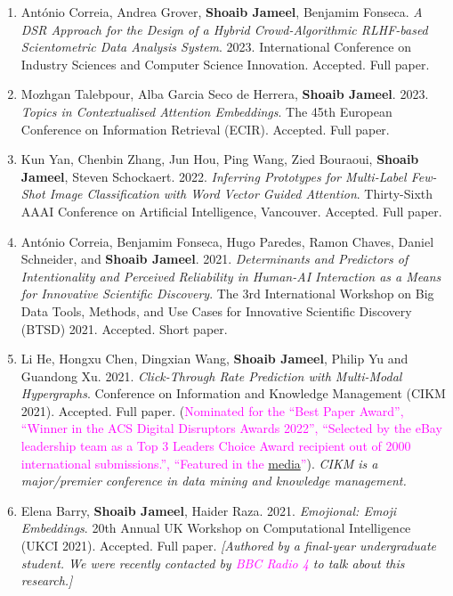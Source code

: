 \documentclass[margin]{res}
\begin{document}
\begin{resume}
\begin{enumerate}
\item Ant\'onio Correia, Andrea Grover, \textbf{Shoaib Jameel}, Benjamim Fonseca. \textit{A DSR Approach for the Design of a Hybrid Crowd-Algorithmic RLHF-based Scientometric Data Analysis System}. 2023. International Conference on Industry Sciences and Computer Science Innovation. Accepted. Full paper. \newline

\item Mozhgan Talebpour, Alba Garcia Seco de Herrera, \textbf{Shoaib Jameel}. 2023. \textit{Topics in Contextualised Attention Embeddings}. The 45th European Conference on Information Retrieval (ECIR). Accepted. Full paper. \newline

\item Kun Yan, Chenbin Zhang, Jun Hou, Ping Wang, Zied Bouraoui, \textbf{Shoaib Jameel}, Steven Schockaert. 2022. \textit{Inferring Prototypes for Multi-Label Few-Shot Image Classification with Word Vector Guided Attention}. Thirty-Sixth AAAI Conference on Artificial Intelligence, Vancouver. Accepted. Full paper. \newline

\item António Correia, Benjamim Fonseca, Hugo Paredes, Ramon Chaves, Daniel Schneider, and \textbf{Shoaib Jameel}. 2021. \textit{Determinants and Predictors of Intentionality and Perceived Reliability in Human-AI Interaction as a Means for Innovative Scientific Discovery}. The 3rd International Workshop on Big Data Tools, Methods, and Use Cases for Innovative Scientific Discovery (BTSD) 2021. Accepted. Short paper. \newline

\item Li He, Hongxu Chen, Dingxian Wang, \textbf{Shoaib Jameel}, Philip Yu and Guandong Xu. 2021. \textit{Click-Through Rate Prediction with Multi-Modal Hypergraphs}. Conference on Information and Knowledge Management (CIKM 2021). Accepted. Full paper. (\textcolor{magenta}{Nominated for the ``Best Paper Award'', ``Winner in the ACS Digital Disruptors Awards 2022'', ``Selected by the eBay leadership team as a Top 3 Leaders Choice Award recipient out of 2000 international submissions.'', ``Featured in the \href{https://www.bandt.com.au/reaching-gen-z-a-new-tool-for-marketers/}{media}''}). \textit{CIKM is a major/premier conference in data mining and knowledge management.} \newline

\item Elena Barry, \textbf{Shoaib Jameel}, Haider Raza. 2021. \textit{Emojional: Emoji Embeddings}. 20th Annual UK Workshop on Computational Intelligence (UKCI 2021). Accepted. Full paper. \textit{[Authored by a final-year undergraduate student. We were recently contacted by \textcolor{magenta}{BBC Radio 4} to talk about this research.]} \newline


\end{enumerate}
\end{resume}
\end{document}
